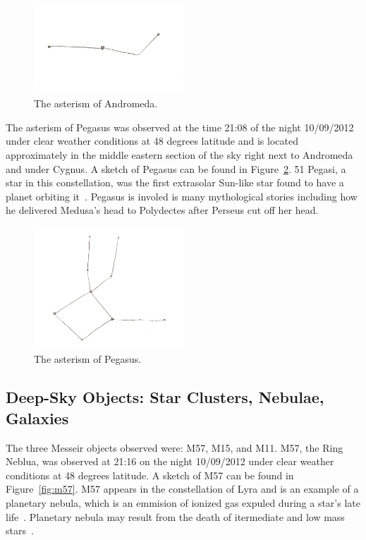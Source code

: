 \documentclass{article}
\begin{document}
\begin{figure}[h]
\centering
\includegraphics[width=0.5\textwidth]{images/andromeda}
\caption{The asterism of Andromeda.\label{fig:and}}
\end{figure}

The asterism of Pegasus was observed at the time 21:08 of the night 10/09/2012 under clear weather conditions at 48 degrees
latitude and is located approximately in the middle eastern section of the sky right next to Andromeda and under Cygnus. A sketch
of Pegasus can be found in Figure~\ref{fig:peg}. 51 Pegasi, a star in this constellation, was the first extrasolar Sun-like star found
to have a planet orbiting it~\cite{Mayor:1995}. Pegasus is involed is many mythological stories including how he delivered Medusa's
head to Polydectes after Perseus cut off her head.

\begin{figure}[h]
\centering
\includegraphics[width=0.5\textwidth]{images/pegasus}
\caption{The asterism of Pegasus.\label{fig:peg}}
\end{figure}

\subsection{Deep-Sky Objects: Star Clusters, Nebulae, Galaxies}

The three Messeir objects observed were: M57, M15, and M11. M57, the Ring Neblua, was observed at 21:16 on the night 10/09/2012 
under clear weather conditions at 48 degrees latitude. A sketch of M57 can be found in Figure~\ref{fig:m57}. M57 appears in the
constellation of Lyra and is an example of a planetary nebula, which is an emmision of ionized gas expuled during a star's late life~\cite{Soker:2009}. Planetary nebula may result from the death of itermediate and low mass stars~\cite{Costa:2009}.
\end{document}
